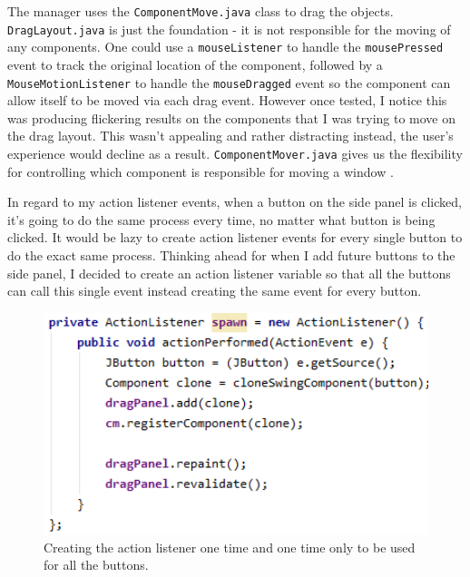 \documentclass[a4paper, 12pt]{article}
\begin{document}
            The manager uses the \texttt{ComponentMove.java} class to drag the objects.
            \texttt{DragLayout.java} is just the foundation - it is not responsible for the moving
            of any components. One could use a \texttt{mouseListener} to handle the \texttt{mousePressed}
            event to track the original location of the component, followed by a \texttt{MouseMotionListener}
            to handle the \texttt{mouseDragged} event so the component can allow itself to be moved via
            each drag event. However once tested, I notice this was producing flickering results on the
            components that I was trying to move on the drag layout. This wasn't appealing and rather
            distracting instead, the user's experience would decline as a result. \texttt{ComponentMover.java}
            gives us the flexibility for controlling which component is responsible for moving a window
            \cite{componentMover}.

            \clearpage
            In regard to my action listener events, when a button on the side panel is clicked,
            it's going to do the same process every time, no matter what button is being
            clicked. It would be lazy to create action listener events for every single button
            to do the exact same process. Thinking ahead for when I add future buttons to the
            side panel, I decided to create an action listener variable so that all the buttons
            can call this single event instead creating the same event for every button. \\

            \begin{figure}[h]
                \centering
                \includegraphics[width=120mm]{actionlistener.png}
                \caption{Creating the action listener one time and one time only to be used for all
                the buttons.}
            \end{figure}
        
\end{document}
